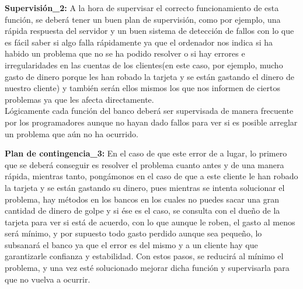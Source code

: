 \textbf{Supervisión\_2:} A la hora de supervisar el correcto funcionamiento de esta función, se deberá tener un buen plan de supervisión, como por ejemplo, una rápida respuesta del servidor y un buen sistema de detección de fallos con lo que es fácil saber si algo falla rápidamente ya que el ordenador nos indica si ha habido un problema que no se ha podido resolver o si hay errores e irregularidades en las cuentas de los clientes(en este caso, por ejemplo, mucho gasto de dinero porque les han robado la tarjeta y se están gastando el dinero de nuestro cliente) y también serán ellos mismos los que nos informen de ciertos problemas ya que les afecta directamente.\\
Lógicamente cada función del banco deberá ser supervisada de manera frecuente por los programadores aunque no hayan dado fallos para ver si es posible arreglar un problema que aún no ha ocurrido.

\textbf{Plan de contingencia\_3:} En el caso de que este error de a lugar, lo primero que se deberá conseguir es resolver el problema cuanto antes y de una manera rápida, mientras tanto, pongámonos en el caso de que a este cliente le han robado la tarjeta y se están gastando su dinero, pues mientras se intenta solucionar el problema, hay métodos en los bancos en los cuales no puedes sacar una gran cantidad de dinero de golpe y si ése es el caso, se consulta con el dueño de la tarjeta para ver si está de acuerdo, con lo que aunque le roben,  el gasto al menos será mínimo, y por supuesto todo gasto perdido aunque sea pequeño, lo subsanará el banco ya que el error es del mismo y a un cliente hay que garantizarle confianza y estabilidad.
Con estos pasos, se reducirá al mínimo el problema, y una vez esté solucionado mejorar dicha función y supervisarla para que no vuelva a ocurrir.
